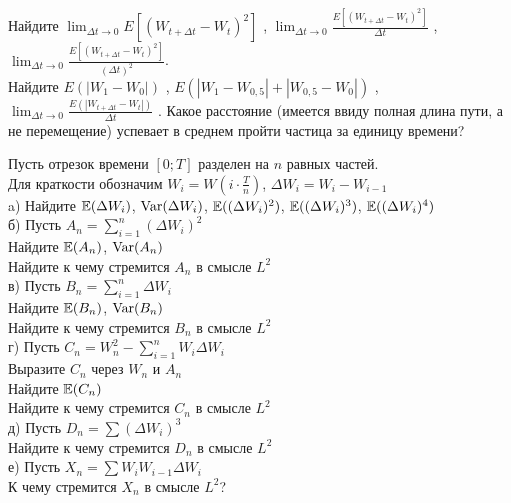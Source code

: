 \begin{problem}
Найдите $\lim_{\Delta t \to 0} E\left[ {\left( {W_{t + \Delta t} -
W_t } \right)^2 } \right]$ , $\lim_{\Delta t \to 0} \frac{{E\left[
{\left( {W_{t + \Delta t} - W_t } \right)^2 } \right]}} {{\Delta
t}}$ , $\lim_{\Delta t \to 0} \frac{{E\left[ {\left( {W_{t +
\Delta t} - W_t } \right)^2 } \right]}} {{\left( {\Delta t}
\right)^2 }}$. \\
Найдите $E\left( {\left| {W_1  - W_0 } \right|} \right)$ ,
$E\left( {\left| {W_1  - W_{0,5} } \right| + \left| {W_{0,5}  -
W_0 } \right|} \right)$ , $\lim_{\Delta t \to 0} \frac{{E\left(
{\left| {W_{t + \Delta t} - W_t } \right|} \right)}} {{\Delta t}}$
. Какое расстояние (имеется ввиду полная длина пути, а не
перемещение) успевает в среднем пройти частица за единицу времени?
\end{problem} 
\begin{solution} 

\end{solution}

\begin{problem}
Пусть отрезок времени $[0;T]$ разделен на $n$ равных частей. \\
Для краткости обозначим $W_{i}=W(i\cdot \frac{T}{n})$, $\Delta W_{i}=W_{i}-W_{i-1}$ \\
a) Найдите $\mathbb{E}(\Delta W_{i})$, $\operatorname{Var}(\Delta W_{i})$, $\mathbb{E}((\Delta W_{i})^{2})$, $\mathbb{E}((\Delta W_{i})^{3})$, $\mathbb{E}((\Delta W_{i})^{4})$ \\
б) Пусть $A_{n}=\sum_{i=1}^{n}(\Delta W_{i})^{2}$ \\
Найдите $\mathbb{E}(A_{n})$, $\operatorname{Var}(A_{n})$ \\
Найдите к чему стремится $A_{n}$ в смысле $L^{2}$ \\
в) Пусть $B_{n}=\sum_{i=1}^{n}\Delta W_{i}$ \\
Найдите $\mathbb{E}(B_{n})$, $\operatorname{Var}(B_{n})$ \\
Найдите к чему стремится $B_{n}$ в смысле $L^{2}$ \\
г) Пусть $C_{n}=W_{n}^{2}-\sum_{i=1}^{n}W_{i}\Delta W_{i}$ \\
Выразите $C_{n}$ через $W_{n}$ и $A_{n}$ \\
Найдите $\mathbb{E}(C_{n})$ \\
Найдите к чему стремится $C_{n}$ в смысле $L^{2}$ \\
д) Пусть $D_{n}=\sum (\Delta W_{i})^{3}$ \\
Найдите к чему стремится $D_{n}$ в смысле $L^{2}$ \\
е) Пусть $X_{n}=\sum W_{i}W_{i-1}\Delta W_{i}$ \\
К чему стремится $X_{n}$ в смысле $L^{2}$? 
\end{problem} 
\begin{solution} 

\end{solution}


